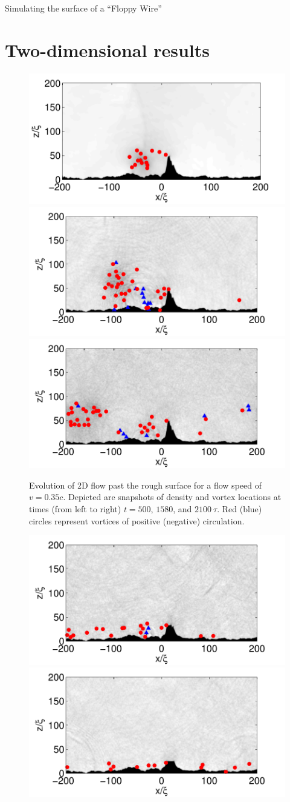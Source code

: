 \begin{chapter}{\label{cha:afm}Simulating the surface of a ``Floppy Wire''}
\section{Two-dimensional results}
\begin{figure}
\includegraphics[width=0.35\linewidth]{./afm/figures/prog-35-500}\hspace{-0.6cm}
\includegraphics[width=0.35\linewidth]{./afm/figures/prog-35-1580}\hspace{-0.6cm}
\includegraphics[width=0.35\linewidth]{./afm/figures/prog-35-2100}
\caption{\label{fig:prog} Evolution of 2D flow past the rough surface for a flow speed of $v=0.35c$.  Depicted are snapshots of density and vortex locations at times (from left to right) $t=500$, $1580$, and $2100~\tau$.  Red (blue) circles represent vortices of positive (negative) circulation.  }%
\end{figure}
\begin{figure}
\includegraphics[width=0.35\linewidth]{./afm/figures/6th-35-2440}\hspace{-0.6cm}
\includegraphics[width=0.35\linewidth]{./afm/figures/8th-35-2440}\hspace{-0.6cm}

\end{figure}
\end{chapter}
